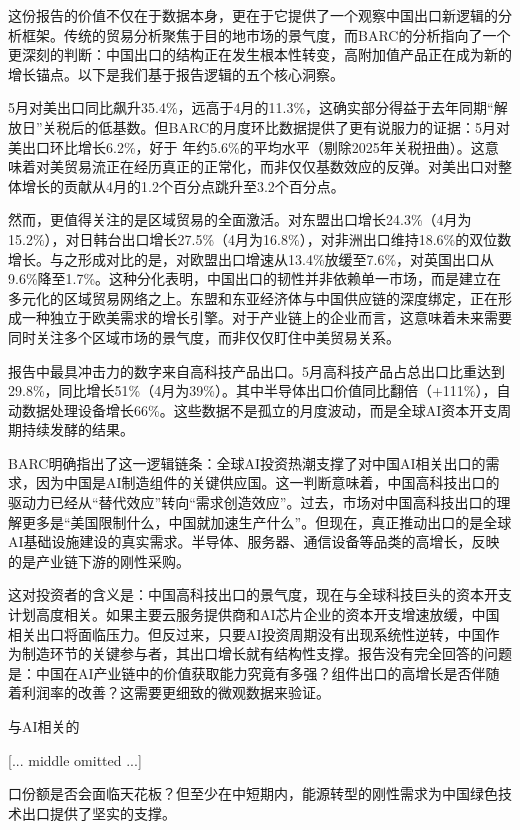 \documentclass[11pt]{ctexart}
\begin{document}
这份报告的价值不仅在于数据本身，更在于它提供了一个观察中国出口新逻辑的分析框架。传统的贸易分析聚焦于目的地市场的景气度，而BARC的分析指向了一个更深刻的判断：中国出口的结构正在发生根本性转变，高附加值产品正在成为新的增长锚点。以下是我们基于报告逻辑的五个核心洞察。

5月对美出口同比飙升35.4\%，远高于4月的11.3\%，这确实部分得益于去年同期“解放日”关税后的低基数。但BARC的月度环比数据提供了更有说服力的证据：5月对美出口环比增长6.2\%，好于 年约5.6\%的平均水平（剔除2025年关税扭曲）。这意味着对美贸易流正在经历真正的正常化，而非仅仅基数效应的反弹。对美出口对整体增长的贡献从4月的1.2个百分点跳升至3.2个百分点。

然而，更值得关注的是区域贸易的全面激活。对东盟出口增长24.3\%（4月为15.2\%），对日韩台出口增长27.5\%（4月为16.8\%），对非洲出口维持18.6\%的双位数增长。与之形成对比的是，对欧盟出口增速从13.4\%放缓至7.6\%，对英国出口从9.6\%降至1.7\%。这种分化表明，中国出口的韧性并非依赖单一市场，而是建立在多元化的区域贸易网络之上。东盟和东亚经济体与中国供应链的深度绑定，正在形成一种独立于欧美需求的增长引擎。对于产业链上的企业而言，这意味着未来需要同时关注多个区域市场的景气度，而非仅仅盯住中美贸易关系。

报告中最具冲击力的数字来自高科技产品出口。5月高科技产品占总出口比重达到29.8\%，同比增长51\%（4月为39\%）。其中半导体出口价值同比翻倍（+111\%），自动数据处理设备增长66\%。这些数据不是孤立的月度波动，而是全球AI资本开支周期持续发酵的结果。

BARC明确指出了这一逻辑链条：全球AI投资热潮支撑了对中国AI相关出口的需求，因为中国是AI制造组件的关键供应国。这一判断意味着，中国高科技出口的驱动力已经从“替代效应”转向“需求创造效应”。过去，市场对中国高科技出口的理解更多是“美国限制什么，中国就加速生产什么”。但现在，真正推动出口的是全球AI基础设施建设的真实需求。半导体、服务器、通信设备等品类的高增长，反映的是产业链下游的刚性采购。

这对投资者的含义是：中国高科技出口的景气度，现在与全球科技巨头的资本开支计划高度相关。如果主要云服务提供商和AI芯片企业的资本开支增速放缓，中国相关出口将面临压力。但反过来，只要AI投资周期没有出现系统性逆转，中国作为制造环节的关键参与者，其出口增长就有结构性支撑。报告没有完全回答的问题是：中国在AI产业链中的价值获取能力究竟有多强？组件出口的高增长是否伴随着利润率的改善？这需要更细致的微观数据来验证。

与AI相关的

[... middle omitted ...]

口份额是否会面临天花板？但至少在中短期内，能源转型的刚性需求为中国绿色技术出口提供了坚实的支撑。
\end{document}
